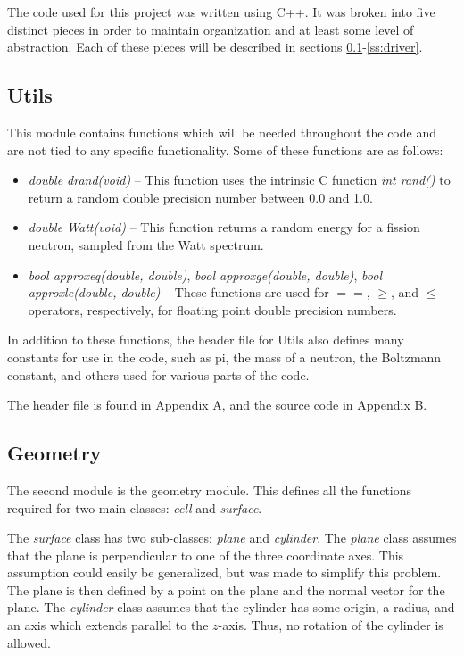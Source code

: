 The code used for this project was written using C++.  It was broken into five distinct pieces in order to maintain organization and at least some level of abstraction.  Each of these pieces will be described in sections \ref{ss:utils}-\ref{ss:driver}.

\subsection{Utils}\label{ss:utils}

This module contains functions which will be needed throughout the code and are not tied to any specific functionality.  Some of these functions are as follows:

\begin{itemize}
\item \textit{double drand(void)} -- This function uses the intrinsic C function \textit{int rand()} to return a random double precision number between 0.0 and 1.0.
\item \textit{double Watt(void)} -- This function returns a random energy for a fission neutron, sampled from the Watt spectrum.
\item \textit{bool approxeq(double, double)}, \textit{bool approxge(double, double)}, \textit{bool approxle(double, double)} -- These functions are used for $==$, $\ge$, and $\le$ operators, respectively, for floating point double precision numbers.
\end{itemize}

In addition to these functions, the header file for Utils also defines many constants for use in the code, such as pi, the mass of a neutron, the Boltzmann constant, and others used for various parts of the code.

The header file is found in Appendix A, and the source code in Appendix B.

\subsection{Geometry}\label{ss:geometry}

The second module is the geometry module.  This defines all the functions required for two main classes: \textit{cell} and \textit{surface}.

The \textit{surface} class has two sub-classes: \textit{plane} and \textit{cylinder}.  The \textit{plane} class assumes that the plane is perpendicular to one of the three coordinate axes.  This assumption could easily be generalized, but was made to simplify this problem.  The plane is then defined by a point on the plane and the normal vector for the plane.  The \textit{cylinder} class assumes that the cylinder has some origin, a radius, and an axis which extends parallel to the $z$-axis.  Thus, no rotation of the cylinder is allowed.

